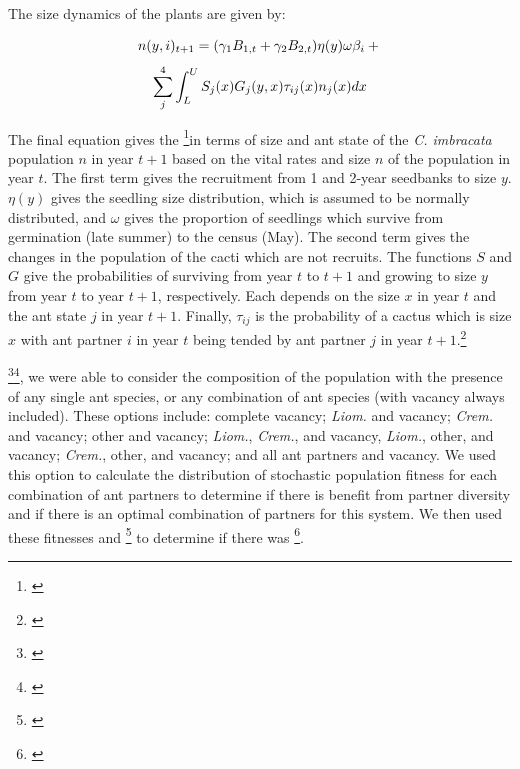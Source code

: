 \documentclass[12pt,a4paper]{article}
\newcommand{\tom}[2]{{\color{red}{#1}}\footnote{\textit{\color{red}{#2}}}}
\begin{document}
		The size dynamics of the plants are given by:
		
		$$
		n(y,i)_{t+1} = (\gamma_1 B_{1,t} + \gamma_2 B_{2,t}) \eta(y) \omega \beta_i  + \\
		$$
		$$
		\sum_{j}^{4} \int_L^U S_j(x) G_j(y,x) \tau_{ij}(x) n_j(x) dx \\
		$$
		
		The final equation gives the \tom{stochastic population composition }{what does this mean?}in terms of size and ant state of the \textit{C. imbracata} population $n$ in year $t+1$ based on the vital rates and size $n$ of the population in year $t$.
		The first term gives the recruitment from 1 and 2-year seedbanks to size $y$.
		$\eta(y)$ gives the seedling size distribution, which is assumed to be normally distributed, and $\omega$ gives the proportion of seedlings which survive from germination (late summer) to the census (May). 
		The second term gives the changes in the population of the cacti which are not recruits. 
		The functions $S$ and $G$ give the probabilities of surviving from year $t$ to $t+1$ and growing to size $y$ from year $t$ to year $t+1$, respectively. 
		Each depends on the size $x$ in year $t$ and the ant state $j$ in year $t+1$. 
		Finally, $\tau_{ij}$ is the probability of a cactus which is size $x$ with ant partner $i$ in year $t$ being tended by ant partner $j$ in year $t+1$.\tom{}{the ants dynamics of the model need to be presented more thoroughly and clearly.} 
		
		\tom{}{This paragraph should get its own subsection. This is about model analysis, not model structure.}\tom{Because many of the vital rates were ant-specific}{you need to explain why some are and some are not}, we were able to consider the composition of the population with the presence of any single ant species, or any combination of ant species (with vacancy always included).
		These options include: complete vacancy; \textit{Liom.} and vacancy; \textit{Crem.} and vacancy; other and vacancy; \textit{Liom.}, \textit{Crem.}, and vacancy, \textit{Liom.}, other, and vacancy; \textit{Crem.}, other, and vacancy; and all ant partners and vacancy.
		We used this option to calculate the distribution of stochastic population fitness for each combination of ant partners to determine if there is benefit from partner diversity and if there is an optimal combination of partners for this system. 
		We then used these fitnesses and \tom{the yearly break-downs of the model}{what does this mean?} to determine if there was \tom{evidence of any biodiversity ecosystem function mechanisms to explain any partner diversity benefits}{you never describe any criteria for detecting the different mechanisms. What does one need to see in data to conclude that one or another is operating?}. 
		
\end{document}
